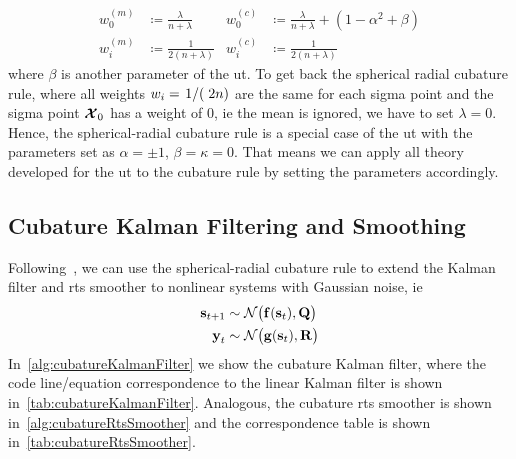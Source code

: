 		\begin{align*}
			w_0^{(m)} &\coloneqq \frac{\lambda}{n + \lambda} & w_0^{(c)} &\coloneqq \frac{\lambda}{n + \lambda} + (1 - \alpha^2 + \beta) \\
			w_i^{(m)} &\coloneqq \frac{1}{2(n + \lambda)}    & w_i^{(c)} &\coloneqq \frac{1}{2(n + \lambda)}
		\end{align*}
		where \(\beta\) is another parameter of the \ac{ut}. To get back the spherical radial cubature rule, where all weights \( w_i = \flatfrac{1}(2n) \) are the same for each sigma point and the sigma point \( \boldsymbol{\mathrm{\mathcal{X}}}_0 \) has a weight of \(0\), \ac{ie} the mean is ignored, we have to set \( \lambda = 0 \). Hence, the spherical-radial cubature rule is a special case of the \ac{ut} with the parameters set as \( \alpha = \pm 1 \), \( \beta = \kappa = 0 \). That means we can apply all theory developed for the \ac{ut} to the cubature rule by setting the parameters accordingly.

	\subsection{Cubature Kalman Filtering and Smoothing}
		Following~\cite{deisenrothProbabilisticPerspectiveGaussian2011,solinCubatureIntegrationMethods2010}, we can use the spherical-radial cubature rule to extend the Kalman filter and \ac{rts} smoother to nonlinear systems with Gaussian noise, \ac{ie}
		\begin{align*}
			\boldsymbol{\mathrm{s}}_{t + 1} &\sim \mathcal{N}\big( \boldsymbol{\mathrm{f}}(\boldsymbol{\mathrm{s}}_t), \boldsymbol{\mathrm{Q}} \big) \\
			\boldsymbol{\mathrm{y}}_t &\sim \mathcal{N}\big( \boldsymbol{\mathrm{g}}(\boldsymbol{\mathrm{s}}_t), \boldsymbol{\mathrm{R}} \big)
		\end{align*}
		In~\autoref{alg:cubatureKalmanFilter} we show the cubature Kalman filter, where the code line/equation correspondence to the linear Kalman filter is shown in~\autoref{tab:cubatureKalmanFilter}. Analogous, the cubature \ac{rts} smoother is shown in~\autoref{alg:cubatureRtsSmoother} and the correspondence table is shown in~\autoref{tab:cubatureRtsSmoother}.

